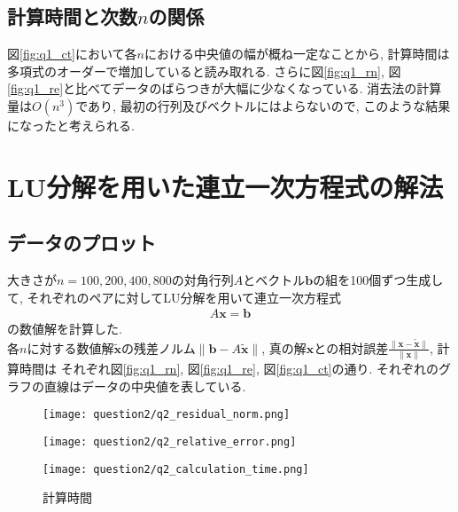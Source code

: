 \documentclass[uplatex,a4j]{jsarticle}
\begin{document}
\subsection{計算時間と次数$n$の関係}
\label{sec:q1_3}
図\ref{fig:q1_ct}において各$n$における中央値の幅が概ね一定なことから, 
計算時間は多項式のオーダーで増加していると読み取れる. 
さらに図\ref{fig:q1_rn}, 図\ref{fig:q1_re}と比べてデータのばらつきが大幅に少なくなっている.
消去法の計算量は$O(n^3)$であり, 最初の行列及びベクトルにはよらないので, このような結果になったと考えられる.


\section{LU分解を用いた連立一次方程式の解法}
\label{sec:q2}

\subsection{データのプロット}
\label{sec:q2_1}

大きさが$n = 100,200,400,800$の対角行列$A$とベクトル$\bm{b}$の組を100個ずつ生成して, 
それぞれのペアに対してLU分解を用いて連立一次方程式
\begin{align}
  A \bm{x} = \bm{b}
\end{align}
の数値解を計算した. \\
各$n$に対する数値解$\bm{\tilde{x}}$の残差ノルム$\| \bm{b} - A \bm{\tilde{x}} \|$, 
真の解$\bm{x}$との相対誤差$\frac{\| \bm{x} - \bm{\tilde{x}} \|}{\| \bm{x} \|}$, 計算時間は
それぞれ図\ref{fig:q1_rn}, 図\ref{fig:q1_re}, 図\ref{fig:q1_ct}の通り. 
それぞれのグラフの直線はデータの中央値を表している.

\begin{figure}[htbp]
  \centering

  \begin{minipage}[t]{0.48\textwidth}
    \centering
    \texttt{[image: question2/q2\_residual\_norm.png]}
    \label{fig:q2_rn}
  \end{minipage}
  \hfill
  \begin{minipage}[t]{0.48\textwidth}
    \centering
    \texttt{[image: question2/q2\_relative\_error.png]}
    \label{fig:q2_re}
  \end{minipage}
  
\end{figure}

\begin{figure}[ht]
  \centering
  \texttt{[image: question2/q2\_calculation\_time.png]}
  \caption{計算時間}
  \label{fig:q2_ct}
\end{figure}
\end{document}
